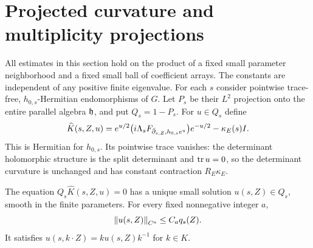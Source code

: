 \section{Projected curvature and multiplicity projections}\label{sec:curvature}

All estimates in this section hold on the product of a fixed small
parameter neighborhood and a fixed small ball of coefficient arrays.
The constants are independent of any positive finite eigenvalue.
For each $s$ consider pointwise trace-free, $h_{0,s}$-Hermitian
endomorphisms of $G$. Let $P_s$ be their $L^2$ projection onto the
entire parallel algebra $\mathfrak h$, and put $Q_s=1-P_s$.
For $u\in Q_s$ define
\begin{equation}\label{eq:conjugatedcurvature}
\widehat K(s,Z,u)=e^{u/2}
\bigl(i\Lambda_sF_{\bar\partial_{s,Z},h_{0,s}e^u}\bigr)e^{-u/2}
-\kappa_E(s)I.
\end{equation}
This is Hermitian for $h_{0,s}$. Its pointwise trace vanishes:
the determinant holomorphic structure is the split determinant and
$\operatorname{tr} u=0$, so the determinant curvature is unchanged and has constant
contraction $R_E\kappa_E$.

\begin{lemma}\label{lem:complement}
The equation $Q_s\widehat K(s,Z,u)=0$ has a unique small solution
$u(s,Z)\in Q_s$, smooth in the finite parameters. For every fixed
nonnegative integer $a$,
\begin{equation}\label{eq:uquadratic}
\left\lVert u(s,Z)\right\rVert_{C^a}\le C_aq_s(Z).
\end{equation}
It satisfies $u(s,k\cdot Z)=ku(s,Z)k^{-1}$ for $k\in K$.
\end{lemma}

